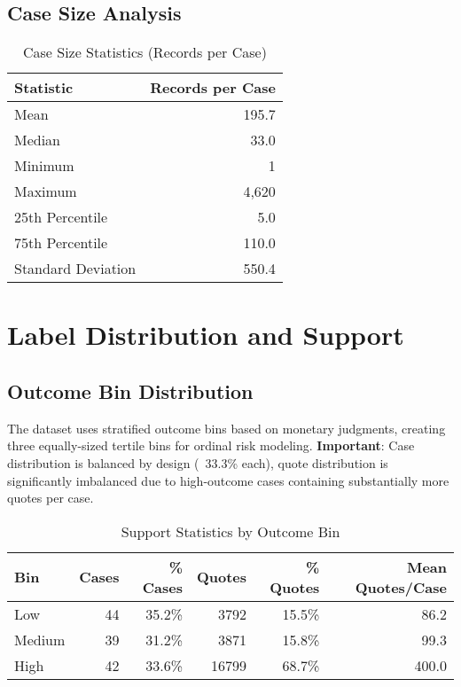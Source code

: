 \documentclass[11pt]{article}
\begin{document}
\subsection{Case Size Analysis}

\begin{table}[H]
\centering
\caption{Case Size Statistics (Records per Case)}
\begin{tabular}{lr}
\toprule
\textbf{Statistic} & \textbf{Records per Case} \\
\midrule
Mean & 195.7 \\
Median & 33.0 \\
Minimum & 1 \\
Maximum & 4,620 \\
25th Percentile & 5.0 \\
75th Percentile & 110.0 \\
Standard Deviation & 550.4 \\
\bottomrule
\end{tabular}
\end{table}

\section{Label Distribution and Support}

\subsection{Outcome Bin Distribution}

The dataset uses stratified outcome bins based on monetary judgments, creating three equally-sized tertile bins for ordinal risk modeling. \textbf{Important}: Case distribution is balanced by design (~33.3\% each), quote distribution is significantly imbalanced due to high-outcome cases containing substantially more quotes per case.

\begin{table}[H]
\centering
\caption{Support Statistics by Outcome Bin}
\begin{tabular}{lrrrrr}
\toprule
\textbf{Bin} & \textbf{Cases} & \textbf{\% Cases} & \textbf{Quotes} & \textbf{\% Quotes} & \textbf{Mean Quotes/Case} \\
\midrule
Low & 44 & 35.2\% & 3792 & 15.5\% & 86.2 \\
Medium & 39 & 31.2\% & 3871 & 15.8\% & 99.3 \\
High & 42 & 33.6\% & 16799 & 68.7\% & 400.0 \\

\bottomrule
\end{tabular}
\end{table}
\end{document}
